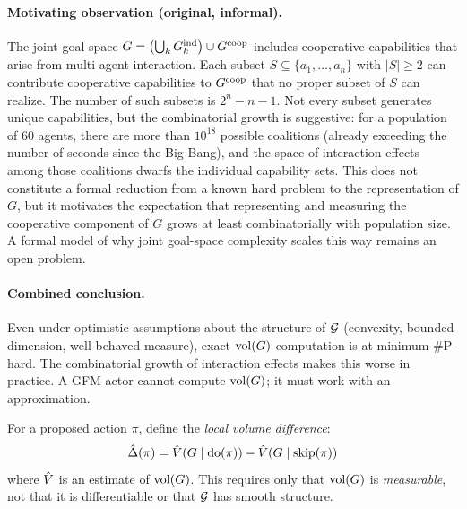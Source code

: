 \paragraph{Motivating observation (original, informal).} The joint goal space
$G = \bigl(\bigcup_k G_{k}^{\mathrm{ind}}\bigr) \cup G^{\mathrm{coop}}$ includes cooperative
capabilities that arise from multi-agent interaction. Each subset $S \subseteq
\{a_1, \ldots, a_n\}$ with $|S| \geq 2$ can contribute cooperative capabilities
to $G^{\mathrm{coop}}$ that no proper subset of $S$ can realize. The number of such
subsets is $2^n - n - 1$. Not every subset generates unique capabilities, but
the combinatorial growth is suggestive: for a population of 60 agents, there
are more than $10^{18}$ possible coalitions (already exceeding the number of
seconds since the Big Bang), and the space of interaction effects among those
coalitions dwarfs the individual capability sets. This does not constitute a
formal reduction from a known hard problem to the representation of $G$, but it
motivates the expectation that representing and measuring the cooperative
component of $G$ grows at least combinatorially with population size. A formal
model of why joint goal-space complexity scales this way remains an open
problem.

\paragraph{Combined conclusion.} Even under optimistic assumptions about the
structure of $\mathcal{G}$ (convexity, bounded dimension, well-behaved measure), exact
$\operatorname{vol}(G)$ computation is at minimum \#P-hard. The combinatorial growth of
interaction effects makes this worse in practice. A GFM actor cannot compute
$\operatorname{vol}(G)$; it must work with an approximation.


\begin{definition}
\label{def:local_volume_estimator}
For a proposed action $\pi$, define the \emph{local volume difference}:
\begin{equation}
\label{eq:local_volume_diff}
\hat{\Delta}(\pi) = \hat{V}(G \mid \mathrm{do}(\pi)) - \hat{V}(G \mid \mathrm{skip}(\pi))
\end{equation}
where $\hat{V}$ is an estimate of $\operatorname{vol}(G)$. This requires only that $\operatorname{vol}(G)$ is
    \emph{measurable}, not that it is differentiable or that $\mathcal{G}$ has smooth
    structure.
\end{definition}

